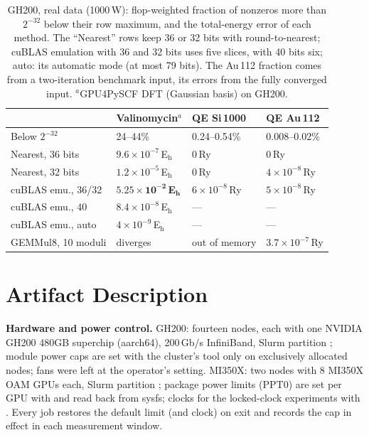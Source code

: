 \documentclass[conference]{IEEEtran}
\newcommand{\W}{\,W}
\newcommand{\Eh}{\,E$_\mathrm{h}$}
\newcommand{\Ry}{\,Ry}
\newcommand{\ee}[2]{#1{\times}10^{#2}}  %
\newcommand{\pct}{\%}
\begin{document}
\begin{table}[t]
\caption{GH200, real data (1000\W): flop-weighted fraction of nonzeros more than $2^{-32}$ below their row maximum, and the
total-energy error of each method. The ``Nearest'' rows keep 36 or 32 bits with round-to-nearest; cuBLAS emulation
with 36 and 32 bits uses five slices, with 40 bits six; auto: its automatic mode (at most 79 bits). The Au\,112
fraction comes from a two-iteration benchmark input, its errors from the fully converged input. $^{a}$GPU4PySCF DFT
(Gaussian basis) on GH200.}\label{tab:span}
\centering\footnotesize\setlength{\tabcolsep}{4pt}
\begin{tabular}{@{}llll@{}}
\toprule
& Valinomycin$^{a}$ & QE Si\,1000 & QE Au\,112 \\
\midrule
Below $2^{-32}$ & 24--44\pct & 0.24--0.54\pct & 0.008--0.02\pct \\
Nearest, 36 bits & $\ee{9.6}{-7}$\Eh & 0\Ry & 0\Ry \\
Nearest, 32 bits & $\ee{1.2}{-5}$\Eh & 0\Ry & $\ee{4}{-8}$\Ry \\
cuBLAS emu., 36/32 & $\mathbf{\ee{5.25}{-2}}$\,\textbf{E}$_\mathbf{h}$ & $\ee{6}{-8}$\Ry & $\ee{5}{-8}$\Ry \\
cuBLAS emu., 40 & $\ee{8.4}{-8}$\Eh & --- & --- \\
cuBLAS emu., auto & $\ee{4}{-9}$\Eh & --- & --- \\
GEMMul8, 10 moduli & diverges & out of memory & $\ee{3.7}{-7}$\Ry \\
\bottomrule
\end{tabular}
\end{table}

\section{Artifact Description}\label{app:artifact}

\textbf{Hardware and power control.} GH200: fourteen nodes, each with one NVIDIA GH200 480GB superchip (aarch64), 200\,Gb/s
InfiniBand, Slurm partition ; module power caps are set with the cluster's  tool only on
exclusively allocated nodes; fans were left at the operator's setting. MI350X: two nodes with 8 MI350X OAM GPUs each,
Slurm partition ; package power limits (PPT0) are set per GPU with  and read back
from sysfs; clocks for the locked-clock experiments with . Every job restores the default
limit (and clock) on exit and records the cap in effect in each measurement window.
\end{document}
